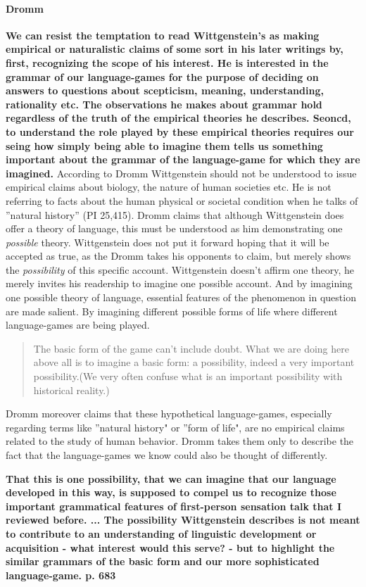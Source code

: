 \documentclass{article}
\begin{document}
\paragraph{Dromm}
\textbf{We can resist the temptation to read Wittgenstein's as making empirical or naturalistic claims of some sort in his later writings by, first, recognizing the scope of his interest. He is interested in the grammar of our language-games for the purpose of deciding on answers to questions about scepticism, meaning, understanding, rationality etc. The observations he makes about grammar hold regardless of the truth of the empirical theories he describes. Seoncd, to understand the role played by these empirical theories requires our seing how simply being able to imagine them tells us something important about the grammar of the language-game for which they are imagined.}
According to Dromm Wittgenstein should not be understood to issue empirical claims about biology, the nature of human societies etc. He is not referring to facts about the human physical or societal condition when he talks of ''natural history'' (PI 25,415). Dromm claims that although Wittgenstein does offer a theory of language, this must be understood as him demonstrating one \textit{possible} theory. Wittgenstein does not put it forward hoping that it will be accepted as true, as the Dromm takes his opponents to claim, but merely shows the \textit{possibility} of this specific account. Wittgenstein doesn't affirm one theory, he merely invites his readership to imagine one possible account. And by imagining one possible theory of language, essential features of the phenomenon in question are made salient. By imagining different possible forms of life where different language-games are being played.\\
\begin{quote}
The basic form of the game can't include doubt. What we are doing here above all is to imagine a basic form: a possibility, indeed a very important possibility.(We very often confuse what is an important possibility with historical reality.)
\end{quote}

Dromm moreover claims that these hypothetical language-games, especially regarding terms like ''natural history" or ''form of life", are no empirical claims related to the study of human behavior. Dromm takes them only to describe the fact that the language-games we know could also be thought of differently.

\textbf{That this is one possibility, that we can imagine that our language developed in this way, is supposed to compel us to recognize those important grammatical features of first-person sensation talk that I reviewed before. ... The possibility Wittgenstein describes is not meant to contribute to an understanding of linguistic development or acquisition - what interest would this serve? - but to highlight the similar grammars of the basic form and our more sophisticated language-game. p. 683}
\end{document}
